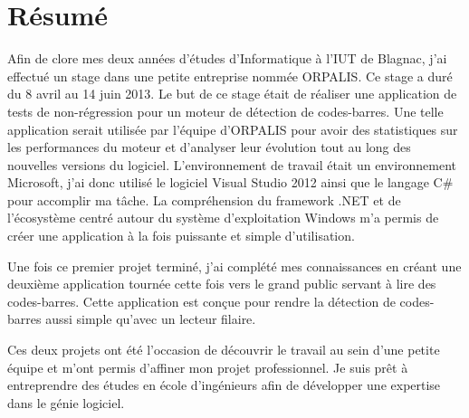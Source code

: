 \chapter*{Résumé}

Afin de clore mes deux années d'études d'Informatique à l'IUT de Blagnac, j'ai effectué un stage dans une petite entreprise nommée ORPALIS. Ce stage a duré du 8 avril au 14 juin 2013. Le but de ce stage était de réaliser une application de tests de non-régression pour un moteur de détection de codes-barres. Une telle application serait utilisée par l'équipe d'ORPALIS pour avoir des statistiques sur les performances du moteur et d'analyser leur évolution tout au long des nouvelles versions du logiciel. L'environnement de travail était un environnement Microsoft, j'ai donc utilisé le logiciel Visual Studio 2012 ainsi que le langage C\# pour accomplir ma tâche. La compréhension du framework .NET et de l'écosystème centré autour du système d'exploitation Windows m'a permis de créer une application à la fois puissante et simple d'utilisation.

Une fois ce premier projet terminé, j'ai complété mes connaissances en créant une deuxième application tournée cette fois vers le grand public servant à lire des codes-barres. Cette application est conçue pour rendre la détection de codes-barres aussi simple qu'avec un lecteur filaire.

Ces deux projets ont été l'occasion de découvrir le travail au sein d'une petite équipe et m'ont permis d'affiner mon projet professionnel. Je suis prêt à entreprendre des études en école d'ingénieurs afin de développer une expertise dans le génie logiciel.